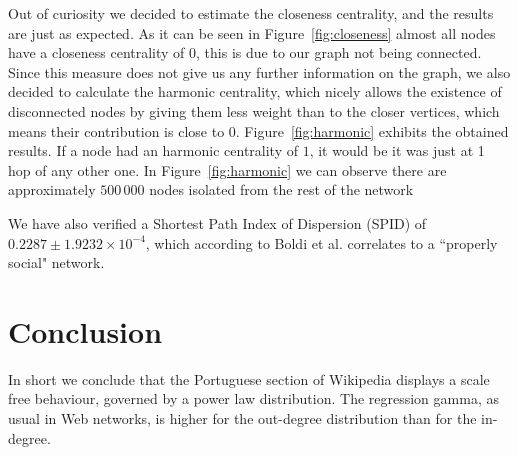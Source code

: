 \documentclass[9pt,a4paper,twocolumn]{article}
\begin{document}
Out of curiosity we decided to estimate the closeness centrality, and the results are just as expected. As it can be seen in Figure~\ref{fig:closeness} almost all nodes have a closeness centrality of 0, this is due to our graph not being connected. Since this measure does not give us any further information on the graph, we also decided to calculate the harmonic centrality, which nicely allows the existence of disconnected nodes by giving them less weight than to the closer vertices, which means their contribution is close to 0. Figure~\ref{fig:harmonic} exhibits the obtained results. If a node had an harmonic centrality of $1$, it would be it was just at 1 hop of any other one. In Figure~\ref{fig:harmonic} we can observe there are approximately $500\,000$ nodes isolated from the rest of the network 

We have also verified a Shortest Path Index of Dispersion (SPID) of $0.2287 \pm 1.9232 \times 10^{-4}$, which according to Boldi et al. \cite{Boldi2011HyperANFAT} correlates to a ``properly social" network.

\section{Conclusion}

In short we conclude that the Portuguese section of Wikipedia displays a scale free behaviour, governed by a power law distribution. The regression gamma, as usual in Web networks, is higher for the out-degree distribution than for the in-degree.


\printglossary[type=\acronymtype]



\end{document}
